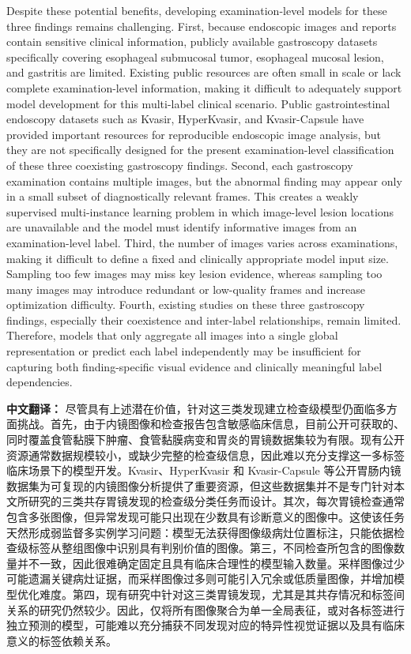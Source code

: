 \documentclass[Afour,sagev,times]{sagej}
\begin{document}
Despite these potential benefits, developing examination-level models for these three findings remains challenging. First, because endoscopic images and reports contain sensitive clinical information, publicly available gastroscopy datasets specifically covering esophageal submucosal tumor, esophageal mucosal lesion, and gastritis are limited. Existing public resources are often small in scale or lack complete examination-level information, making it difficult to adequately support model development for this multi-label clinical scenario. Public gastrointestinal endoscopy datasets such as Kvasir, HyperKvasir, and Kvasir-Capsule have provided important resources for reproducible endoscopic image analysis, but they are not specifically designed for the present examination-level classification of these three coexisting gastroscopy findings.\cite{R4,R5,R6} Second, each gastroscopy examination contains multiple images, but the abnormal finding may appear only in a small subset of diagnostically relevant frames. This creates a weakly supervised multi-instance learning problem in which image-level lesion locations are unavailable and the model must identify informative images from an examination-level label.\cite{R7} Third, the number of images varies across examinations, making it difficult to define a fixed and clinically appropriate model input size. Sampling too few images may miss key lesion evidence, whereas sampling too many images may introduce redundant or low-quality frames and increase optimization difficulty. Fourth, existing studies on these three gastroscopy findings, especially their coexistence and inter-label relationships, remain limited. Therefore, models that only aggregate all images into a single global representation or predict each label independently may be insufficient for capturing both finding-specific visual evidence and clinically meaningful label dependencies.

\textbf{中文翻译：} 尽管具有上述潜在价值，针对这三类发现建立检查级模型仍面临多方面挑战。首先，由于内镜图像和检查报告包含敏感临床信息，目前公开可获取的、同时覆盖食管黏膜下肿瘤、食管黏膜病变和胃炎的胃镜数据集较为有限。现有公开资源通常数据规模较小，或缺少完整的检查级信息，因此难以充分支撑这一多标签临床场景下的模型开发。Kvasir、HyperKvasir 和 Kvasir-Capsule 等公开胃肠内镜数据集为可复现的内镜图像分析提供了重要资源，但这些数据集并不是专门针对本文所研究的三类共存胃镜发现的检查级分类任务而设计。其次，每次胃镜检查通常包含多张图像，但异常发现可能只出现在少数具有诊断意义的图像中。这使该任务天然形成弱监督多实例学习问题：模型无法获得图像级病灶位置标注，只能依据检查级标签从整组图像中识别具有判别价值的图像。第三，不同检查所包含的图像数量并不一致，因此很难确定固定且具有临床合理性的模型输入数量。采样图像过少可能遗漏关键病灶证据，而采样图像过多则可能引入冗余或低质量图像，并增加模型优化难度。第四，现有研究中针对这三类胃镜发现，尤其是其共存情况和标签间关系的研究仍然较少。因此，仅将所有图像聚合为单一全局表征，或对各标签进行独立预测的模型，可能难以充分捕获不同发现对应的特异性视觉证据以及具有临床意义的标签依赖关系。
\end{document}
